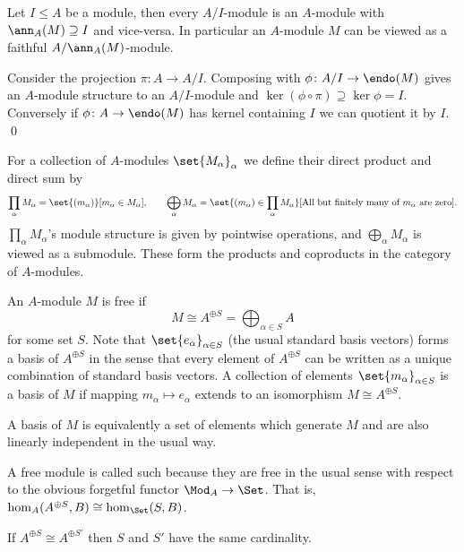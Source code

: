 \bprop

    Let $I\leq A$ be a module, then every $A/I$-module is an $A$-module with $\ann_A(M)\supseteq I$ and vice-versa.
    In particular an $A$-module $M$ can be viewed as a faithful $A/\ann_A(M)$-module.

\eprop

\bproof

    Consider the projection $\pi\colon A\to A/I$.
    Composing with $\phi\colon A/I\to\endo(M)$ gives an $A$-module structure to an $A/I$-module and $\ker(\phi\circ\pi)\supseteq\ker\phi=I$.
    Conversely if $\phi\colon A\to\endo(M)$ has kernel containing $I$ we can quotient it by $I$.
    \qed

\eproof

\bdefn

    For a collection of $A$-modules $\set{M_\alpha}_\alpha$ we define their {\emphcolor direct product} and {\emphcolor direct sum}
    by
    $$ \prod_\alpha M_\alpha = \set{(m_\alpha)}[m_\alpha\in M_\alpha],\qquad
    \bigoplus_\alpha M_\alpha = \set{(m_\alpha)\in\prod_\alpha M_\alpha}[\hbox{All but finitely many of $m_\alpha$ are zero}] . $$
    $\prod_\alpha M_\alpha$'s module structure is given by pointwise operations, and $\bigoplus_\alpha M_\alpha$ is viewed as a submodule.
    These form the products and coproducts in the category of $A$-modules.

\edefn

\bdefn

    An $A$-module $M$ is {\emphcolor free} if
    $$ M \cong A^{\oplus S} = \bigoplus_{\alpha\in S}A $$
    for some set $S$.
    Note that $\set{e_\alpha}_{\alpha\in S}$ (the usual standard basis vectors) forms a basis of $A^{\oplus S}$ in the sense that every
    element of $A^{\oplus S}$ can be written as a unique combination of standard basis vectors.
    A collection of elements $\set{m_\alpha}_{\alpha\in S}$ is a {\emphcolor basis} of $M$ if mapping $m_\alpha\mapsto e_\alpha$ extends
    to an isomorphism $M\cong A^{\oplus S}$.

\edefn

A basis of $M$ is equivalently a set of elements which generate $M$ and are also linearly independent in the usual way.

A free module is called such because they are free in the usual sense with respect to the obvious forgetful functor $\Mod_A\to\Set$.
That is, $\hom_A(A^{\oplus S},B)\cong\hom_\Set(S,B)$.

\bprop

    If $A^{\oplus S}\cong A^{\oplus S'}$ then $S$ and $S'$ have the same cardinality.

